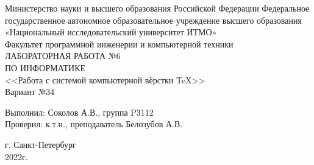 
% 


\begin{center}
    

\large Министерство науки и высшего образования Российской Федерации
Федеральное государственное автономное образовательное учреждение высшего образования \\«Национальный исследовательский университет ИТМО» \\Факультет программной инженерии и компьютерной техники\\
\vspace*{\fill}
\LARGE ЛАБОРАТОРНАЯ РАБОТА №6\\ПО ИНФОРМАТИКЕ\\<<Работа с системой компьютерной вёрстки \TeX>>\\
\LARGE Вариант №34 \\
\end{center}
\vspace{10cm}
\begin{flushright}
  Выполнил: Соколов А.В., группа P3112\\
  Проверил: к.т.н., преподаватель Белозубов А.В.\\
\end{flushright}

\vspace{5cm}
\begin{center}
    г. Санкт-Петербург\\
    2022г.
\end{center}


   




% 

